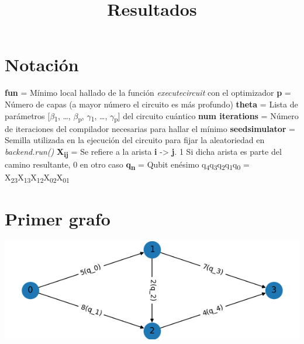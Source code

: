 \documentclass[letterpaper]{article}
\date{}
\title{Resultados}
\begin{document}
\maketitle
\tableofcontents


\section{Notación}
\label{sec:org5f6e8a3}
\textbf{fun} = Mínimo local hallado de la función \emph{execute\textunderscore circuit} con el optimizador
\newline
\textbf{p} = Número de capas (a mayor número el circuito es más profundo)
\newline
\textbf{theta} = Lista de parámetros [\(\beta\)\textsubscript{1}, \ldots{}, \(\beta\)\textsubscript{p}, \(\gamma\)\textsubscript{1}, \ldots{}, \(\gamma\)\textsubscript{p}] del circuito cuántico
\newline
\textbf{num iterations} = Número de iteraciones del compilador necesarias para hallar el mínimo
\newline
\textbf{seed\textunderscore simulator} = Semilla utilizada en la ejecución del circuito para fijar la aleatoriedad en \emph{backend.run()}
\newline
\textbf{X\textsubscript{ij}} = Se refiere a la arista \textbf{i} -> \textbf{j}. 1 Si dicha arista es parte del camino resultante, 0 en otro caso
\newline
\textbf{q\textsubscript{n}} = Qubit enésimo
\newline
q\textsubscript{4}q\textsubscript{3}q\textsubscript{2}q\textsubscript{1}q\textsubscript{0} = X\textsubscript{23}X\textsubscript{13}X\textsubscript{12}X\textsubscript{02}X\textsubscript{01}
\newpage

\section{Primer grafo}
\label{sec:org57f33eb}
\begin{center}
\includegraphics[width=.9\linewidth]{./img/primer_grafo.png}
\end{center}
\newpage
\end{document}
